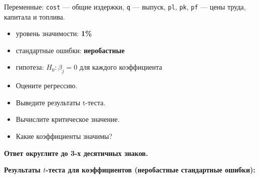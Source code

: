 \documentclass[
  russian,
]{article}
\providecommand{\tightlist}{%
  \setlength{\itemsep}{0pt}\setlength{\parskip}{0pt}}
\begin{document}
Переменные: \texttt{cost} --- общие издержки, \texttt{q} --- выпуск,
\texttt{pl}, \texttt{pk}, \texttt{pf} --- цены труда, капитала и
топлива.

\begin{tcolorbox}[enhanced jigsaw, arc=.35mm, bottomrule=.15mm, bottomtitle=1mm, breakable, colback=white, colbacktitle=quarto-callout-important-color!10!white, colframe=quarto-callout-important-color-frame, coltitle=black, left=2mm, leftrule=.75mm, opacityback=0, opacitybacktitle=0.6, rightrule=.15mm, title=\textcolor{quarto-callout-important-color}{\faExclamation}\hspace{0.5em}{Условия теста}, titlerule=0mm, toprule=.15mm, toptitle=1mm]

\begin{itemize}
\tightlist
\item
  уровень значимости: \textbf{1\%}
\item
  стандартные ошибки: \textbf{неробастные}
\item
  гипотеза: \(H_0:\beta_j=0\) для каждого коэффициента
\end{itemize}

\end{tcolorbox}

\begin{itemize}
\tightlist
\item
  Оцените регрессию.
\item
  Выведите результаты t-теста.
\item
  Вычислите критическое значение.
\item
  Какие коэффициенты значимы?
\end{itemize}

\textbf{Ответ округлите до 3-х десятичных знаков.}

\textbf{Результаты \(t\)-теста для коэффициентов (неробастные
стандартные ошибки):}
\end{document}
